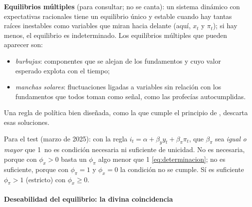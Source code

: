 \documentclass[11pt]{article}
\begin{document}
\begin{anotaciones}
\textbf{Equilibrios múltiples} (para consultar; no se canta): un sistema dinámico con expectativas racionales tiene un equilibrio único y estable cuando hay tantas raíces inestables como variables que miran hacia delante (aquí, $x_t$ y $\pi_t$); si hay menos, el equilibrio es indeterminado. Los equilibrios múltiples que pueden aparecer son\nocite{BlanchardFischer1989Lectures}:
\begin{itemize}
\item \emph{burbujas}: componentes que se alejan de los fundamentos y cuyo valor esperado explota con el tiempo;
\item \emph{manchas solares}: fluctuaciones ligadas a variables sin relación con los fundamentos que todos toman como señal, como las profecías autocumplidas.
\end{itemize}
Una regla de política bien diseñada, como la que cumple el principio de , descarta esas soluciones.
\end{anotaciones}

\begin{notaopositor}
Para el test (marzo de 2025): con la regla $i_t=\alpha+\beta_y y_t+\beta_\pi\pi_t$, que $\beta_\pi$ sea \emph{igual o mayor} que 1~no es condición necesaria ni suficiente de unicidad. No es necesaria, porque con $\phi_x>0$ basta un $\phi_\pi$ algo menor que 1 \eqref{eq:determinacion}; no es suficiente, porque con $\phi_\pi=1$ y $\phi_x=0$ la condición no se cumple. Sí es suficiente $\phi_\pi>1$ (estricto) con $\phi_x\geq0$.
\end{notaopositor}

\paragraph{Deseabilidad del equilibrio: la divina coincidencia}
\end{document}
